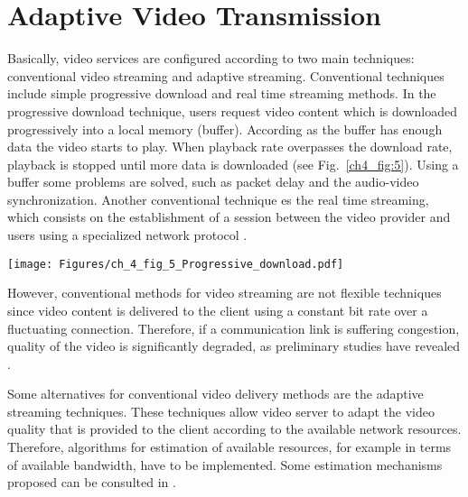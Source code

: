 
\section{Adaptive Video Transmission}
\label{sec:4.4}

Basically, video services are configured according to two main techniques: conventional video streaming and adaptive streaming. Conventional techniques include simple progressive download and real time streaming methods. In the progressive download technique, users request video content which is downloaded progressively into a local memory (buffer). According as the buffer has enough data the video starts to play. When playback rate overpasses the download rate, playback is stopped until more data is downloaded (see Fig.~\ref{ch4_fig:5}). Using a buffer some problems are solved, such as packet delay and the audio-video synchronization. Another conventional technique es the real time streaming, which consists on the establishment of a session between the video provider and users using a specialized network protocol \cite{castellanos_quality_2015}.

\begin{center}
\texttt{[image: Figures/ch\_4\_fig\_5\_Progressive\_download.pdf]}
\label{ch4_fig:5}       %
\end{center}


However, conventional methods for video streaming are not flexible techniques since video content is delivered to the client using a constant bit rate over a fluctuating  connection. Therefore, if a communication link is suffering congestion, quality of the video is significantly degraded, as preliminary studies have revealed \cite{castellanos_quality_2015,gonzalez_2016}.

Some alternatives for conventional video delivery methods are the adaptive streaming techniques. These techniques allow video server to adapt the video quality that is provided to the client according to the available network resources. Therefore, algorithms for estimation of available resources, for example in terms of available bandwidth, have to be implemented. Some estimation mechanisms proposed can be  consulted in \cite{castellanos_available_2019,chaud_2015}. 

